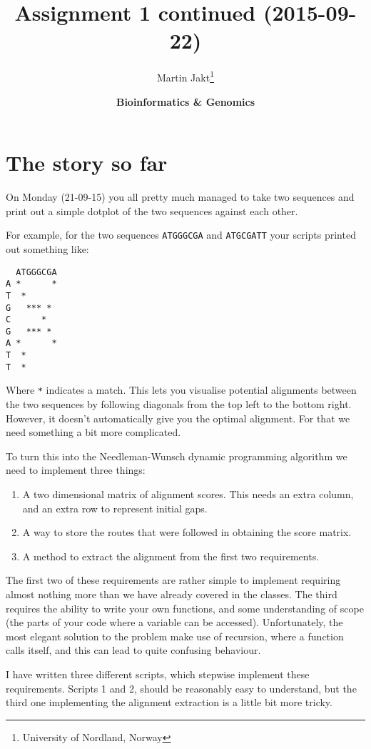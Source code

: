 \documentclass[11pt]{article}
\author{Martin Jakt\thanks{University of Nordland, Norway}}
\date{\textbf{Bioinformatics \& Genomics}}
\title{\textbf{Assignment 1 continued} (2015-09-22)}
\begin{document}
\maketitle

\section{The story so far}
\label{sec-1}
On Monday (21-09-15) you all pretty much managed to take two sequences
and print out a simple dotplot of the two sequences against each other.

For example, for the two sequences \texttt{ATGGGCGA}
and \texttt{ATGCGATT} your scripts printed out something like:
\begin{spacing}{0.75}
\begin{verbatim}
  ATGGGCGA
A *      *
T  *     
G   *** *
C      * 
G   *** * 
A *      *
T  *      
T  *      
\end{verbatim}
\end{spacing}
Where \texttt{*} indicates a match. This lets you visualise potential
alignments between the two sequences by following diagonals from the
top left to the bottom right. However, it doesn't automatically give
you the optimal alignment. For that we need something a bit more complicated.

To turn this into the Needleman-Wunsch dynamic programming algorithm we
need to implement three things:
\begin{enumerate}
\item A two dimensional matrix of alignment scores. This needs an
  extra column, and an extra row to represent initial gaps.
\item A way to store the routes that were followed in obtaining
  the score matrix.
\item A method to extract the alignment from the first two requirements.
\end{enumerate}
The first two of these requirements are rather simple to implement requiring
almost nothing more than we have already covered in the classes. The third
requires the ability to write your own functions, and some understanding of
scope (the parts of your code where a variable can be accessed). Unfortunately,
the most elegant solution to the problem make use of recursion,
where a function calls itself, and this can lead to quite confusing behaviour.

I have written three different scripts, which stepwise implement these
requirements. Scripts 1 and 2, should be reasonably easy to understand,
but the third one implementing the alignment extraction is a little bit
more tricky.
\end{document}
